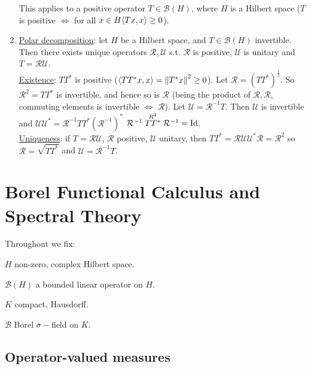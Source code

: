 \documentclass{article}
\begin{document}
\begin{enumerate}
    This applies to a positive operator $T\in \mathcal{B}(H)$, where $H$ is a Hilbert space ($T$ is positive $\iff$ for all $x\in H \langle Tx, x\rangle\geq 0$).
    \item \noindent\underline{Polar decomposition}: let $H$ be a Hilbert space, and $T\in \mathcal{B}(H)$ invertible. Then there exists unique operators $\mathcal{R}, \mathcal{U}$ s.t. $\mathcal{R}$ is positive, $\mathcal{U}$ is unitary and $T = \mathcal{R}\mathcal{U}$.\\

    \noindent\underline{Existence}: $TT^*$ is positive ($\langle TT^*x, x\rangle = \left\lVert T^*x\right\rVert^2\geq 0$). Let $\mathcal{R} = (TT^*)^{\frac{1}{2}}$. So $\mathcal{R}^2=TT^*$ is invertible, and hence so is $\mathcal{R}$ (being the product of $\mathcal{R}, \mathcal{R}$, commuting elements is invertible $\iff$ $\mathcal{R}$). Let $\mathcal{U} = \mathcal{R}^{-1}T$. Then $\mathcal{U}$ is invertible and $\mathcal{U}\mathcal{U}^* = \mathcal{R}^{-1}TT^*(\mathcal{R}^{-1})^*$ $\mathcal{R}^{-1}\stackrel{R^2}{TT^*}\mathcal{R}^{-1} = \operatorname{Id}$.\\

    \noindent\underline{Uniqueness}: if $T = \mathcal{R} \mathcal{U}$, $\mathcal{R}$ positive, $\mathcal{U}$ unitary, then $TT^* = \mathcal{R}\mathcal{U}\mathcal{U}^*\mathcal{R}=\mathcal{R}^2$ so $\mathcal{R}=\sqrt{TT^*}$ and $\mathcal{U}=\mathcal{R}^{-1}T$.
\end{enumerate}

\newpage
\section{Borel Functional Calculus and Spectral Theory}

Throughout we fix: 
\begin{description}
    \item $H$ non-zero, complex Hilbert space.
    \item $\mathcal{B}(H)$ a bounded linear operator on $H$.
    \item $K$ compact, Hausdorff. 
    \item $\mathcal{B}$ Borel $\sigma-$field on $K$.
\end{description} 

\subsection{Operator-valued measures}
\end{document}
